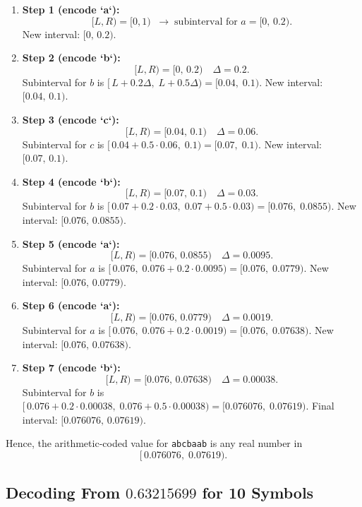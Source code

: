 \documentclass{article}
\begin{document}
\begin{enumerate}
    \item \textbf{Step 1 (encode `a`):} 
    \[
    [L,R) = [0,1) \;\;\to\; 
      \text{subinterval for $a$} = [0,\,0.2).
    \]
    New interval: $[0,\,0.2)$.

    \item \textbf{Step 2 (encode `b`):}
    \[
    [L,R) = [0,\,0.2)\quad \Delta = 0.2.
    \]
    Subinterval for $b$ is $[\,L + 0.2\Delta,\; L + 0.5\Delta) = [0.04,\; 0.1).$
    New interval: $[0.04,\,0.1)$.

    \item \textbf{Step 3 (encode `c`):}
    \[
    [L,R) = [0.04,\,0.1)\quad \Delta = 0.06.
    \]
    Subinterval for $c$ is $[\,0.04 + 0.5\cdot 0.06,\; 0.1) = [0.07,\; 0.1).$
    New interval: $[0.07,\,0.1)$.

    \item \textbf{Step 4 (encode `b`):}
    \[
    [L,R) = [0.07,\,0.1)\quad \Delta = 0.03.
    \]
    Subinterval for $b$ is $[\,0.07 + 0.2\cdot 0.03,\; 0.07 + 0.5\cdot 0.03) = [0.076,\; 0.0855).$
    New interval: $[0.076,\,0.0855)$.

    \item \textbf{Step 5 (encode `a`):}
    \[
    [L,R) = [0.076,\,0.0855)\quad \Delta = 0.0095.
    \]
    Subinterval for $a$ is $[\,0.076,\; 0.076 + 0.2\cdot 0.0095) = [0.076,\; 0.0779).$
    New interval: $[0.076,\,0.0779)$.

    \item \textbf{Step 6 (encode `a`):}
    \[
    [L,R) = [0.076,\,0.0779)\quad \Delta = 0.0019.
    \]
    Subinterval for $a$ is $[\,0.076,\; 0.076 + 0.2\cdot 0.0019) = [0.076,\; 0.07638).$
    New interval: $[0.076,\,0.07638)$.

    \item \textbf{Step 7 (encode `b`):}
    \[
    [L,R) = [0.076,\,0.07638)\quad \Delta = 0.00038.
    \]
    Subinterval for $b$ is $[\,0.076 + 0.2\cdot 0.00038,\; 0.076 + 0.5\cdot 0.00038) = [0.076076,\; 0.07619)$.
    Final interval: $[0.076076,\,0.07619)$.
\end{enumerate}

Hence, the arithmetic-coded value for \texttt{abcbaab} is any real number in 
\[
[\,0.076076,\; 0.07619).
\]

\subsection{Decoding From $0.63215699$ for 10 Symbols}
\end{document}
